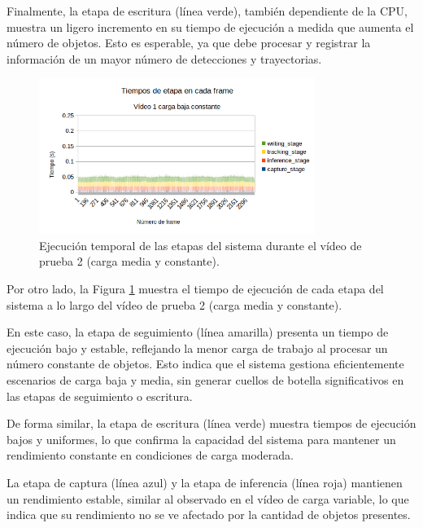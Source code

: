 \documentclass[11pt,spanish,listoffigures,listoftables]{tfgetsinf}
\begin{document}
Finalmente, la etapa de escritura (línea verde), también dependiente de la CPU, muestra un ligero incremento en su tiempo de ejecución a medida que aumenta el número de objetos. Esto es esperable, ya que debe procesar y registrar la información de un mayor número de detecciones y trayectorias.


\begin{figure}[H]
   \centering
   \includegraphics[width=0.8\textwidth]{images/analisis_de_la_solucion/tiempos_etapa_video1.png}
   \caption[Ejecución temporal de las etapas del sistema durante el vídeo de prueba 2 (carga media y constante)]{Ejecución temporal de las etapas del sistema durante el vídeo de prueba 2 (carga media y constante).}
   \label{fig:tiempos_etapa_video1}
\end{figure}

Por otro lado, la Figura \ref{fig:tiempos_etapa_video1} muestra el tiempo de ejecución de cada etapa del sistema a lo largo del vídeo de prueba 2 (carga media y constante).

En este caso, la etapa de seguimiento (línea amarilla) presenta un tiempo de ejecución bajo y estable, reflejando la menor carga de trabajo al procesar un número constante de objetos. Esto indica que el sistema gestiona eficientemente escenarios de carga baja y media, sin generar cuellos de botella significativos en las etapas de seguimiento o escritura.

De forma similar, la etapa de escritura (línea verde) muestra tiempos de ejecución bajos y uniformes, lo que confirma la capacidad del sistema para mantener un rendimiento constante en condiciones de carga moderada.

La etapa de captura (línea azul) y la etapa de inferencia (línea roja) mantienen un rendimiento estable, similar al observado en el vídeo de carga variable, lo que indica que su rendimiento no se ve afectado por la cantidad de objetos presentes.
\end{document}
